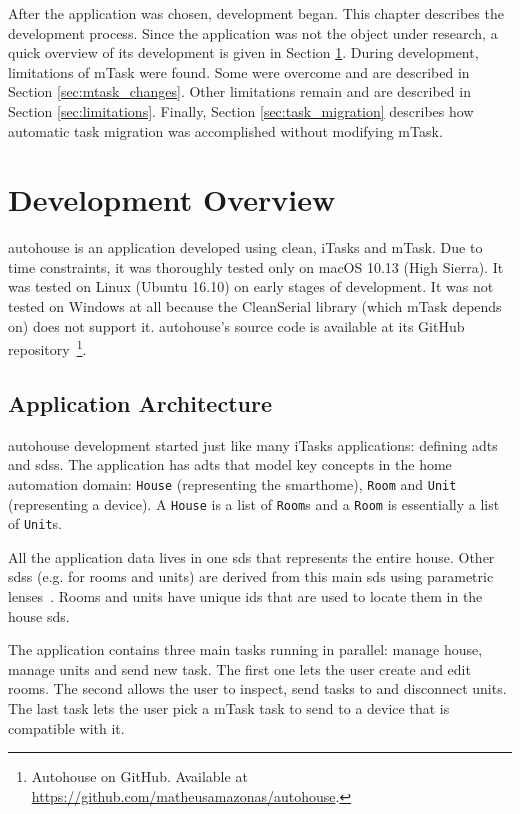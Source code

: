 After the application was chosen, development began. This chapter describes the development process. Since the application was not the object under research, a quick overview of its development is given in Section \ref{sec:dev_overview}. During development, limitations of \gls{mTask} were found. Some were overcome and are described in Section \ref{sec:mtask_changes}. Other limitations remain and are described in Section \ref{sec:limitations}. Finally, Section \ref{sec:task_migration} describes how automatic task migration was accomplished without modifying \gls{mTask}.

\section{Development Overview}\label{sec:dev_overview}
\gls{autohouse} is an application developed using \gls{clean}, \gls{iTasks} and \gls{mTask}. Due to time constraints, it was thoroughly tested only on macOS 10.13 (High Sierra). It was tested on Linux (Ubuntu 16.10) on early stages of development. It was not tested on Windows at all because the CleanSerial library (which \gls{mTask} depends on) does not support it. \gls{autohouse}'s source code is available at its GitHub repository~\footnote{Autohouse on GitHub. Available at \url{https://github.com/matheusamazonas/autohouse}.}.

\subsection{Application Architecture}
\gls{autohouse} development started just like many \gls{iTasks} applications: defining \acsp{adt} and \acsp{sds}. The application has \acsp{adt} that model key concepts in the home automation domain: \texttt{House} (representing the smarthome), \texttt{Room} and \texttt{Unit} (representing a device). A \texttt{House} is a list of \texttt{Room}s and a \texttt{Room} is essentially a list of \texttt{Unit}s. 

All the application data lives in one \acs{sds} that represents the entire house. Other \acsp{sds} (e.g. for rooms and units) are derived from this main \acs{sds} using parametric lenses~\cite{parametric}. Rooms and units have unique ids that are used to locate them in the house \acs{sds}. 

The application contains three main tasks running in parallel: manage house, manage units and send new task. The first one lets the user create and edit rooms. The second allows the user to inspect, send tasks to and disconnect units. The last task lets the user pick a \gls{mTask} task to send to a device that is compatible with it.

